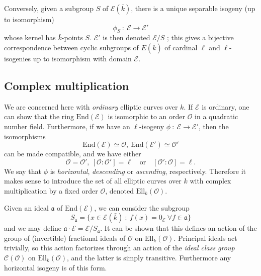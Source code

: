\documentclass[12pt]{article}
\renewcommand{\frak}{\mathfrak}
\newcommand{\E}{\mathcal{E}}
\newcommand{\End}{\mathrm{End}}
\renewcommand{\O}{\mathcal{O}}
\newcommand{\Ell}{\mathrm{Ell}}
\newcommand{\Cl}{\mathcal{C}}
\begin{document}
Conversely, given a subgroup $S$ of $\E(\bar{k})$, there is a unique separable isogeny (up to isomorphism)
$$\phi_S\ :\ \E \to \E'$$
whose kernel has $\bar{k}$-points $S$. $\E'$ is then denoted $\E/S$ ; this gives a bijective correspondence between cyclic subgroups of $E(\bar{k})$ of cardinal $\ell$ and $\ell$-isogenies up to isomorphism with domain $\E$.

\subsection{Complex multiplication} We are concerned here with \emph{ordinary} elliptic curves over $k$. If $\E$ is ordinary, one can show that the ring $\End(\E)$ is isomorphic to an order $\O$ in a quadratic number field. Furthermore, if we have an $\ell$-isogeny $\phi\ :\ \E\to\E'$, then the isomorphisms
$$\End(\E) \simeq \O,\ \End(\E') \simeq \O'$$
can be made compatible, and we have either
$$\O = \O',\ [\O : \O'] = \ell\quad \text{or}\quad [\O' : \O] = \ell.$$
We say that $\phi$ is \emph{horizontal}, \emph{descending} or \emph{ascending}, respectively. Therefore it makes sense to introduce the set of all elliptic curves over $k$ with complex multiplication by a fixed order $\O$, denoted $\Ell_k(\O)$.

Given an ideal $\frak a$ of $\End(\E)$, we can consider the subgroup
$$S_{\frak a} = \{x \in \E(\bar{k})\ :\ f(x) = 0_{\E}\ \forall f\in \frak a\}$$
and we may define $\frak a\cdot \E = \E /S_{\frak a}$. It can be shown that this defines an action of the group of (invertible) fractional ideals of $\O$ on $\Ell_k(\O)$. Principal ideals act trivially, so this action factorizes through an action of the \emph{ideal class group} $\Cl(\O)$ on $\Ell_k(\O)$, and the latter is simply transitive. Furthermore any horizontal isogeny is of this form.
\end{document}
